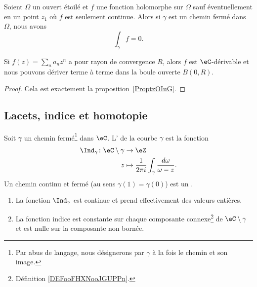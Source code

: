 \begin{proposition}   \label{PrpopwQSbJg}
	Soient \( \Omega\) un ouvert étoilé et \( f\) une fonction holomorphe sur \( \Omega\) sauf éventuellement en un point \( z_1\) où \( f\) est seulement continue. Alors si \( \gamma\) est un chemin fermé dans \( \Omega\), nous avons
	\begin{equation}
		\int_{\gamma}f=0.
	\end{equation}
\end{proposition}

\begin{proposition}     \label{PropRZCKeO}
	Si \( f(z)=\sum_na_nz^n\) a pour rayon de convergence \( R\), alors \( f\) est $\eC$-dérivable et nous pouvons dériver terme à terme dans la boule ouverte \( B(0,R)\).
\end{proposition}

\begin{proof}
	Cela est exactement la proposition~\ref{ProptzOIuG}.
\end{proof}

\subsection{Lacets, indice et homotopie}

\begin{propositionDef}      \label{DEFooLFBNooGlvJmp}
	Soit \( \gamma\) un chemin fermé\footnote{Par abus de langage, nous désignerons par \( \gamma\) à la fois le chemin et son image.} dans \( \eC\). L' de la courbe \( \gamma\) est la fonction
	\begin{equation}
		\begin{aligned}
			\Ind_{\gamma}\colon \eC\setminus \gamma & \to \eZ                                                              \\
			z                                       & \mapsto \frac{1}{ 2\pi i }\int_{\gamma}\frac{ d\omega }{ \omega-z }.
		\end{aligned}
	\end{equation}
	Un chemin continu et fermé (au sens \( \gamma(1)=\gamma(0)\)) est un .
	\begin{enumerate}
		\item
		      La fonction \( \Ind_{\gamma}\) est continue et prend effectivement des valeurs entières.
		\item
		      La fonction indice est constante sur chaque composante connexe\footnote{Définition \ref{DEFooFHXNooJGUPPn}.} de \( \eC\setminus \gamma\) et est nulle sur la composante non bornée.
	\end{enumerate}
\end{propositionDef}

